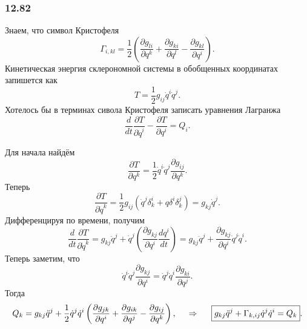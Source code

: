 \subsubsection*{12.82}
Знаем, что символ Кристофеля
\begin{equation*}
    \Gamma_{i,kl} = \frac{1}{2} \left(
        \frac{\partial g_{li}}{\partial q^k} + \frac{\partial g_{ki}}{\partial q^l} -
        \frac{\partial g_{kl}}{\partial q^i} 
    \right).
\end{equation*}
Кинетическая энергия склерономной системы в обобщенных координатах запишется как
\begin{equation*}
    T  = \frac{1}{2} g_{ij} \dot{q}^i \dot{q}^j.
\end{equation*}
Хотелось бы в терминах сивола Кристофеля записать уравнения Лагранжа
\begin{equation*}
    \frac{d }{d t} \frac{\partial T}{\partial \dot{q}^i} - \frac{\partial T}{\partial q^i} = Q_i.
\end{equation*}

Для начала найдём
\begin{equation*}
    \frac{\partial T}{\partial q^k} = \frac{1}{2} \dot{q}^i \dot{q}^j \frac{\partial g_{ij}}{\partial q^k}.
\end{equation*}
Теперь
\begin{equation*}
    \frac{\partial T}{\partial \dot{q}^k} = 
    \frac{1}{2} g_{ij} \left(
        \dot{q}^j \delta^i_k + q\delta^i \delta^j_k
    \right) = g_{kj} \dot{q}^j.
\end{equation*}
Дифференцируя по времени, получим
\begin{equation*}
    \frac{d }{d t} \frac{\partial T}{\partial \dot{q}^k} =
    g_{kj} \ddot{q}^j + 
    \dot{q}^j \left(
        \frac{\partial g_{kj}}{\partial q^i} \frac{d q^i}{d t} 
    \right) = 
    g_{kj} \ddot{q}^j + \frac{\partial g_{kj}}{\partial q^i} \dot{q}^j \dot{q}^i.
\end{equation*}
Теперь заметим, что
\begin{equation*}
    \dot{q}^i \dot{q}^j \frac{\partial g_{kj}}{\partial q^i} =
     \dot{q}^j \dot{q}^i \frac{\partial g_{ki}}{\partial q^j} .
\end{equation*}
Тогда
\begin{equation}
    Q_k =
    g_{kj} \ddot{q}^j + \frac{1}{2} \dot{q}^j \dot{q}^i
    \left(
        \frac{\partial g_{jk}}{\partial q^i} + \frac{\partial g_{ik}}{\partial q^j} 
        - \frac{\partial g_{ij}}{\partial q^k} 
    \right) , \hspace{0.5cm} \Rightarrow \hspace{0.5cm} 
    \boxed{
        g_{kj} \ddot{q}^j + \Gamma_{k, ij} \dot{q}^j \dot{q}^i = Q_k
    }.
\end{equation}